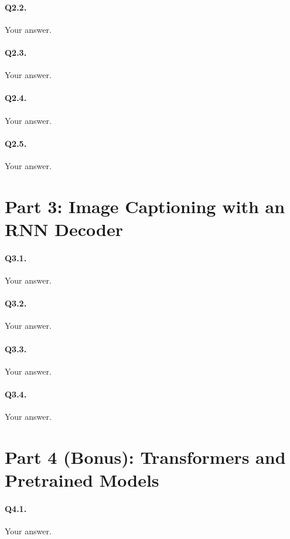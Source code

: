 \documentclass[11pt,a4paper]{article}
\begin{document}
\paragraph{Q2.2.} Your answer.

\paragraph{Q2.3.} Your answer.

\paragraph{Q2.4.} Your answer.

\paragraph{Q2.5.} Your answer.


\section*{Part 3: Image Captioning with an RNN Decoder}

\paragraph{Q3.1.} Your answer.

\paragraph{Q3.2.} Your answer.

\paragraph{Q3.3.} Your answer.

\paragraph{Q3.4.} Your answer.


\section*{Part 4 (Bonus): Transformers and Pretrained Models}

\paragraph{Q4.1.} Your answer.
\end{document}
